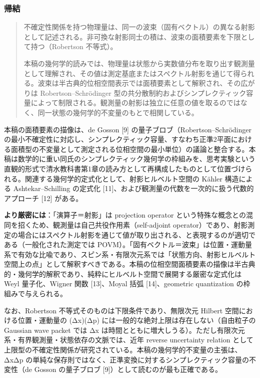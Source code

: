 \documentclass[
  11pt,
]{ltjsarticle}
\begin{document}
\subsubsection{帰結}\label{ux5e30ux7d50-4}

\begin{quote}
不確定性関係を持つ物理量は、同一の波束（固有ベクトル）の異なる射影として記述される。非可換な射影同士の積は、波束の面積要素を下限として持つ（Robertson
不等式）。

本稿の幾何学的読みでは、物理量は状態から実数値分布を取り出す観測量として理解され、その値は測定基底またはスペクトル射影を通じて得られる。波束は半古典的位相空間表示では面積要素として解釈され、その広がりは
Robertson--Schrödinger
型の共分散制約およびシンプレクティック容量によって制限される。観測量の射影は独立に任意の値を取るのではなく、同一状態の幾何学的不変量のもとで相関している。
\end{quote}

本稿の面積要素の描像は、de Gosson {[}9{]}
の量子ブロブ（Robertson--Schrödinger
の最小不確定性に対応し、シンプレクティック容量、すなわち正準2平面における面積型の不変量として測定される位相空間の最小単位）の議論と整合する。本稿は数学的に重い同氏のシンプレクティック幾何学の枠組みを、思考実験という直観的形式で清水教科書第1章の読み方として再構成したものとして位置づけられる。関連する幾何学的定式化として、射影ヒルベルト空間の
Kähler 構造による Ashtekar--Schilling の定式化
{[}11{]}、および観測量の代数を一次的に扱う代数的アプローチ {[}12{]}
がある。

\textbf{より厳密には}：「演算子＝射影」は projection operator
という特殊な概念との混同を招くため、観測量は自己共役作用素（self-adjoint
operator）であり、射影測定の場合にはスペクトル射影を通じて値が取り出される、と表現するのが適切である（一般化された測定では
POVM）。「固有ベクトル＝波束」は位置・運動量系で有効な比喩であり、スピン系・有限次元系では「状態方向、射影ヒルベルト空間上の点」として解釈すべきである。本稿の位相空間面積要素の描像は半古典的・幾何学的解釈であり、純粋にヒルベルト空間で展開する厳密な定式化は
Weyl 量子化、Wigner 関数 {[}13{]}、Moyal 括弧 {[}14{]}、geometric
quantization の枠組みで与えられる。

なお、Robertson 不等式そのものは下限条件であり、無限次元 Hilbert
空間における位置・運動量の (Δx)(Δp)
には一般的な絶対上限は存在しない（自由粒子の Gaussian wave packet では
Δx
は時間とともに増大しうる）。ただし有限次元系・有界観測量・状態依存の文脈では、近年
reverse uncertainty relation
として上限型の不確定性関係が研究されている。本稿の幾何学的不変量の主張は、ΔxΔp
の単純な保存則ではなく、正準変換に対するシンプレクティック容量の不変性（de
Gosson の量子ブロブ {[}9{]}）として読むのが最も正確である。
\end{document}
